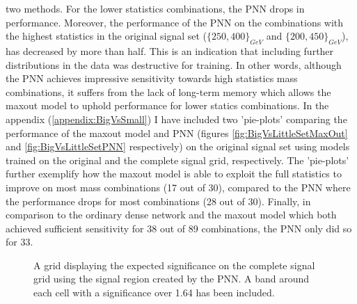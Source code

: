 two methods. For the lower statistics combinations, the \ac{PNN} drops in performance. Moreover, the performance of the \ac{PNN} on the combinations with the highest 
statistics in the original signal set ($\{250,400\}_{GeV}$ and $\{200,450\}_{GeV}$), has decreased by more than half.
This is an indication that including further distributions in the data was destructive for training. In other words, although the \ac{PNN} achieves impressive sensitivity towards high 
statistics mass combinations, it suffers from the lack of long-term memory which allows the maxout model to uphold performance for lower statics combinations. In the appendix 
(\ref{appendix:BigVsSmall}) I have included two 'pie-plots' comparing the performance of the maxout model and \ac{PNN} (figures \ref{fig:BigVsLittleSetMaxOut} and \ref{fig:BigVsLittleSetPNN} 
respectively) on the original signal set using models trained on the original and the complete signal grid, respectively. The 'pie-plots' further exemplify how the maxout model is able to exploit 
the full statistics to improve on most mass combinations (17 out of 30), compared to the \ac{PNN} where the performance drops for most combinations (28 out of 30). Finally, in comparison to the ordinary 
dense network and the maxout model which both achieved sufficient sensitivity for 38 out of 89 combinations, the \ac{PNN} only did so for 33.\\
\begin{figure}
    \caption{A grid displaying the expected significance on the complete signal grid using the signal region 
    created by the \acs{PNN}. A band around each cell with a significance over 1.64 has been included.}
    \label{fig:PNNPCA_FS_MLMGridSig}
\end{figure}
